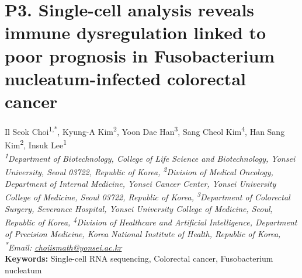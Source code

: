 
\section*{P3. Single-cell analysis reveals immune dysregulation linked to poor prognosis in Fusobacterium nucleatum-infected colorectal cancer}

\begin{center}
Il Seok Choi\textsuperscript{1,*}, Kyung-A Kim\textsuperscript{2}, Yoon Dae Han\textsuperscript{3}, Sang Cheol Kim\textsuperscript{4}, Han Sang Kim\textsuperscript{2}, Insuk Lee\textsuperscript{1} \\
\vspace{0.2cm}
\textit{\textsuperscript{1}Department of Biotechnology, College of Life Science and Biotechnology, Yonsei University, Seoul 03722, Republic of Korea, \textsuperscript{2}Division of Medical Oncology, Department of Internal Medicine, Yonsei Cancer Center, Yonsei University College of Medicine, Seoul 03722, Republic of Korea, \textsuperscript{3}Department of Colorectal Surgery, Severance Hospital, Yonsei University College of Medicine, Seoul, Republic of Korea, \textsuperscript{4}Division of Healthcare and Artificial Intelligence, Department of Precision Medicine, Korea National Institute of Health, Republic of Korea, \textsuperscript{*}Email: \href{mailto:choiismath@yonsei.ac.kr}{choiismath@yonsei.ac.kr}} \\
\vspace{0.2cm}
\textbf{Keywords:} Single-cell RNA sequencing, Colorectal cancer, Fusobacterium nucleatum
\end{center}

